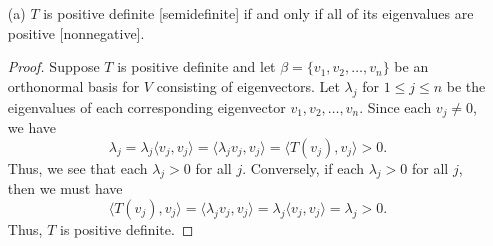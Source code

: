 \begin{enumerate}
    \item[(a)] \( T  \) is positive definite [semidefinite] if and only if all of its eigenvalues are positive [nonnegative].
        \begin{proof}
        Suppose \( T  \) is positive definite and let \( \beta = \{ {v}_{1}, {v}_{2}, \dots, {v}_{n} \}  \) be an orthonormal basis for \( V  \) consisting of eigenvectors. Let \( \lambda_j \) for \( 1 \leq j \leq n  \) be the eigenvalues of each corresponding eigenvector \( {v}_{1}, {v}_{2}, \dots, {v}_{n}  \). Since each \( {v}_{j} \neq 0  \), we have
        \[  {\lambda}_{j} = {\lambda}_{j} \langle {v}_{j} , {v}_{j}  \rangle = \langle {\lambda}_{j} {v}_{j} , {v}_{j} \rangle = \langle T({v}_{j}) , {v}_{j} \rangle > 0. \]
        Thus, we see that each \( \lambda_j > 0  \) for all \( j  \). Conversely, if each \( {\lambda}_{j} > 0  \) for all \( j  \), then we must have
        \[  \langle T({v}_{j}) , {v}_{j} \rangle = \langle {\lambda}_{j} {v}_{j} , {v}_{j} \rangle = {\lambda}_{j} \langle {v}_{j} , {v}_{j} \rangle = \lambda_j > 0. \]
        Thus, \( T  \) is positive definite.


\end{proof}
\end{enumerate}
